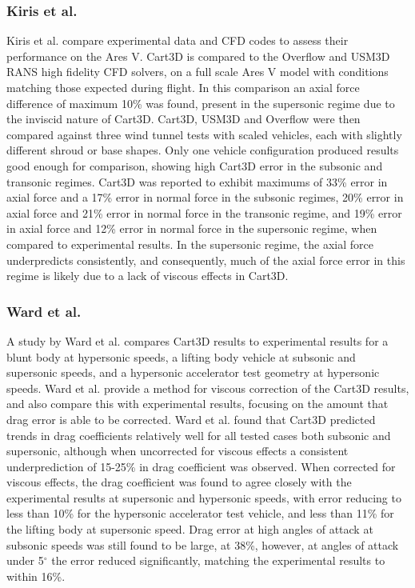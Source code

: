 \subsubsection{Kiris et al.}
Kiris et al. compare experimental data and CFD codes to assess their performance on the Ares V\cite{Kiris2011}. Cart3D is compared to the Overflow and USM3D RANS high fidelity CFD solvers, on a full scale Ares V model with conditions matching those expected during flight. In this comparison an axial force difference of maximum 10\% was found, present in the supersonic regime due to the inviscid nature of Cart3D\cite{Kiris2011}. Cart3D, USM3D and Overflow were then compared against three wind tunnel tests with scaled vehicles, each with slightly different shroud or base shapes. Only one vehicle configuration produced results good enough for comparison\cite{Kiris2011}, showing high Cart3D error in the subsonic and transonic regimes. Cart3D was reported to exhibit maximums of 33\% error in axial force and a 17\% error in normal force in the subsonic regimes, 20\% error in axial force and 21\% error in normal force in the transonic regime, and 19\% error in axial force and 12\% error in normal force in the supersonic regime, when compared to experimental results. In the supersonic regime, the axial force underpredicts consistently, and consequently, much of the axial force error in this regime is likely due to a lack of viscous effects in Cart3D. 

\subsubsection{Ward et al.}
A study by Ward et al.\cite{Ward2018} compares Cart3D results to experimental results for a blunt body at hypersonic speeds, a lifting body vehicle at subsonic and supersonic speeds, and a hypersonic accelerator test geometry at hypersonic speeds. Ward et al. provide a method for viscous correction of the Cart3D results, and also compare this with experimental results, focusing on the amount that drag error is able to be corrected. Ward et al. found that Cart3D predicted trends in drag coefficients relatively well for all tested cases both subsonic and supersonic, although when uncorrected for viscous effects a consistent underprediction of 15-25\% in drag coefficient was observed\cite{Ward2018}. When corrected for viscous effects, the drag coefficient was found to agree closely with the experimental results at supersonic and hypersonic speeds, with error reducing to less than 10\% for the hypersonic accelerator test vehicle, and less than 11\% for the lifting body at supersonic speed\cite{Ward2018}. Drag error at high angles of attack at subsonic speeds was still found to be large, at 38\%, however, at angles of attack under 5$^\circ$ the error reduced significantly, matching the experimental results to within 16\%. 

